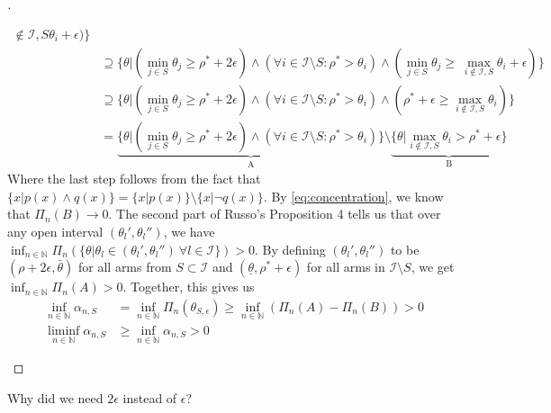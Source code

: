 \begin{proof}[]
\begin{itemize}
\begin{align}
{          \notin \mathcal{I}, S} \theta_i + \epsilon)\} \\
      & \supseteq \{\theta |(\min_{j \in S} \theta_j \geq \rho^* + 2 \epsilon)
          \wedge (\forall i \in \mathcal{I} \setminus S: \rho^* > \theta_i)
          \wedge (\min_{j \in S} \theta_j \geq\ \max_{i \notin \mathcal{I}, S}
          \theta_i + \epsilon)\} \\
      & \supseteq \{\theta |(\min_{j \in S} \theta_j \geq \rho^* + 2 \epsilon)
          \wedge (\forall i \in \mathcal{I} \setminus S: \rho^* > \theta_i)
          \wedge (\rho^* + \epsilon \geq \max_{i \notin \mathcal{I}, S}
          \theta_i)\} \\
      &= \underbrace{\{\theta |(\min_{j \in S} \theta_j \geq \rho^* + 2
          \epsilon) \wedge (\forall i \in \mathcal{I} \setminus S: \rho^* >
          \theta_i) \}}_\text{A} \setminus \underbrace{\{\theta| \max_{i \notin
          \mathcal{I}, S} \theta_i > \rho^* + \epsilon\}}_\text{B}
  \end{align}
  Where the last step follows from the fact that $\{x|p(x) \wedge q(x)\} =
  \{x|p(x)\} \setminus \{x|\neg q(x)\}$. By \eqref{eq:concentration}, we know
  that $\Pi_n(B) \rightarrow 0$. The second part of Russo's Proposition 4 tells
  us that over any open interval $(\theta_l', \theta_l'')$, we have $\inf_{n \in
  \mathbb{N}} \Pi_n(\{\theta| \theta_l \in (\theta_l', \theta_l'')\ \forall l
  \in \mathcal{I}\}) > 0$. By defining $(\theta_l', \theta_l'')$ to be $(\rho +
  2 \epsilon, \bar{\theta})$ for all arms from $S \subset \mathcal{I}$ and
  $(\underline{\theta}, \rho^* + \epsilon)$ for all arms in $\mathcal{I}
  \setminus S$, we get $\inf_{n \in \mathbb{N}} \Pi_n(A) > 0$. Together, this
  gives us
  \begin{align}
    \inf_{n \in \mathbb{N}} \alpha_{n, S} &= \inf_{n \in \mathbb{N}}
        \Pi_n(\theta_{S, \epsilon}) \geq \inf_{n \in \mathbb{N}}(\Pi_n(A) -
        \Pi_n(B)) > 0 \\
    \liminf_{n \in \mathbb{N}} \alpha_{n, S} &\geq \inf_{n \in \mathbb{N}}
        \alpha_{n, S} > 0
  \end{align}
  \end{itemize}
\end{proof}

\begin{remark}[Kevin 19/09/05]
  Why did we need $2\epsilon$ instead of $\epsilon$?
\end{remark}

